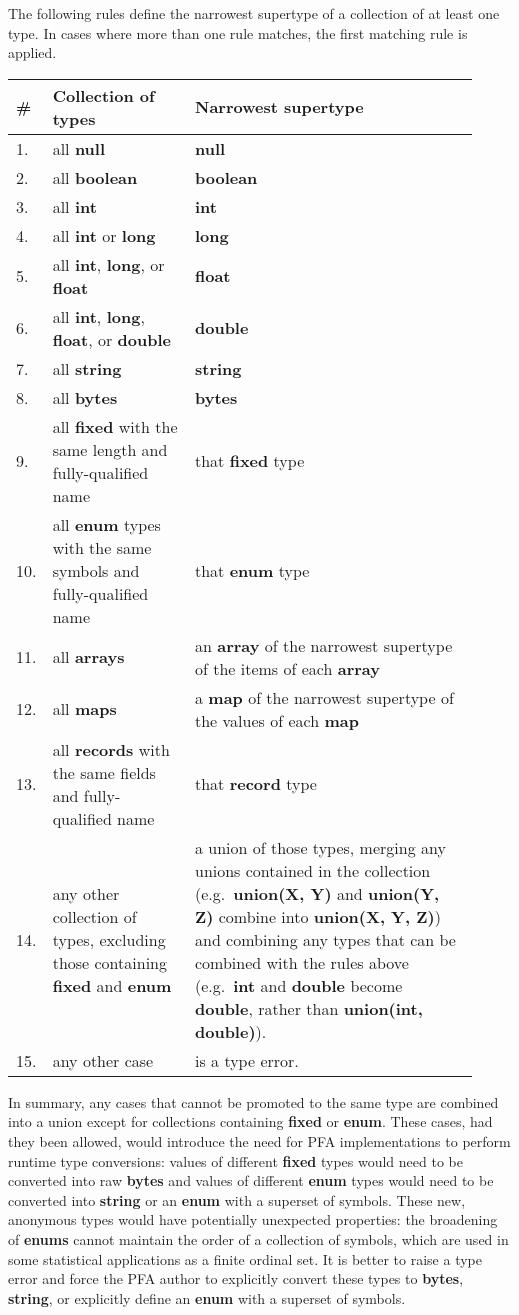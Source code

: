 \documentclass{article}
\newcommand{\PFAtp}{\ttfamily\bfseries}
\theoremstyle{definition}
\begin{document}
The following rules define the narrowest supertype of a collection of at least one type.  In cases where more than one rule matches, the first matching rule is applied.
\noindent\begin{longtable}{p{0.02\linewidth} p{0.3\linewidth} p{0.6\linewidth}}
\# & {\bf Collection of types} & {\bf Narrowest supertype} \\\hline\endhead
1. & all {\bf null} & {\bf null} \\
2. & all {\bf boolean} & {\bf boolean} \\
3. & all {\bf int} & {\bf int} \\
4. & all {\bf int} or {\bf long} & {\bf long} \\
5. & all {\bf int}, {\bf long}, or {\bf float} & {\bf float} \\
6. & all {\bf int}, {\bf long}, {\bf float}, or {\bf double} & {\bf double} \\
7. & all {\bf string} & {\bf string} \\
8. & all {\bf bytes} & {\bf bytes} \\
9. & all {\bf fixed} with the same length and fully-qualified name & that {\bf fixed} type \\
10. & all {\bf enum} types with the same symbols and fully-qualified name & that {\bf enum} type \\
11. & all {\bf arrays} & an {\bf array} of the narrowest supertype of the items of each {\bf array} \\
12. & all {\bf maps} & a {\bf map} of the narrowest supertype of the values of each {\bf map} \\
13. & all {\bf records} with the same fields and fully-qualified name & that {\bf record} type \\
14. & any other collection of types, excluding those containing {\bf fixed} and {\bf enum} & a union of those types, merging any unions contained in the collection (e.g.\ {\bf union({\PFAtp X}, {\PFAtp Y})} and {\bf union({\PFAtp Y}, {\PFAtp Z})} combine into {\bf union({\PFAtp X}, {\PFAtp Y}, {\PFAtp Z})}) and combining any types that can be combined with the rules above (e.g.\ {\bf int} and {\bf double} become {\bf double}, rather than {\bf union(int, double)}). \\
15. & any other case & is a type error.
\end{longtable}

In summary, any cases that cannot be promoted to the same type are combined into a union except for collections containing {\bf fixed} or {\bf enum}.  These cases, had they been allowed, would introduce the need for PFA implementations to perform runtime type conversions: values of different {\bf fixed} types would need to be converted into raw {\bf bytes} and values of different {\bf enum} types would need to be converted into {\bf string} or an {\bf enum} with a superset of symbols.  These new, anonymous types would have potentially unexpected properties: the broadening of {\bf enums} cannot maintain the order of a collection of symbols, which are used in some statistical applications as a finite ordinal set.  It is better to raise a type error and force the PFA author to explicitly convert these types to {\bf bytes}, {\bf string}, or explicitly define an {\bf enum} with a superset of symbols.
\end{document}
